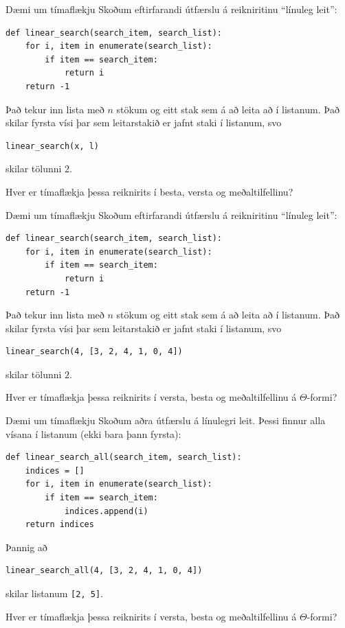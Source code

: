 \documentclass{beamer}
\begin{document}
\begin{frame}[fragile]{Dæmi um tímaflækju}
Skoðum eftirfarandi útfærslu á reikniritinu ``línuleg leit'':

\begin{verbatim}
def linear_search(search_item, search_list):
    for i, item in enumerate(search_list):
        if item == search_item:
            return i
    return -1
\end{verbatim}

Það tekur inn lista með $n$ stökum og eitt stak sem á að leita að í listanum. Það skilar fyrsta vísi þar sem leitarstakið er jafnt staki í listanum, svo 
\begin{verbatim}
linear_search(x, l) 
\end{verbatim}
skilar tölunni $2$.

Hver er tímaflækja þessa reiknirits í besta, versta og meðaltilfellinu?

\end{frame}

\begin{frame}[fragile]{Dæmi um tímaflækju}
Skoðum eftirfarandi útfærslu á reikniritinu ``línuleg leit'':

\begin{verbatim}
def linear_search(search_item, search_list):
    for i, item in enumerate(search_list):
        if item == search_item:
            return i
    return -1
\end{verbatim}

Það tekur inn lista með $n$ stökum og eitt stak sem á að leita að í listanum. Það skilar fyrsta vísi þar sem leitarstakið er jafnt staki í listanum, svo 
\begin{verbatim}
linear_search(4, [3, 2, 4, 1, 0, 4])
\end{verbatim}
skilar tölunni $2$.

Hver er tímaflækja þessa reiknirits í versta, besta og meðaltilfellinu á $\Theta$-formi?
\end{frame}

\begin{frame}[fragile]{Dæmi um tímaflækju}
Skoðum aðra útfærslu á línulegri leit. Þessi finnur alla vísana í listanum (ekki bara þann fyrsta):
\begin{verbatim}
def linear_search_all(search_item, search_list):
    indices = []
    for i, item in enumerate(search_list):
        if item == search_item:
            indices.append(i)
    return indices
\end{verbatim}
Þannig að
\begin{verbatim}
linear_search_all(4, [3, 2, 4, 1, 0, 4])
\end{verbatim}
skilar listanum \texttt{[2, 5]}.

Hver er tímaflækja þessa reiknirits í versta, besta og meðaltilfellinu á $\Theta$-formi?
\end{frame}
\end{document}
